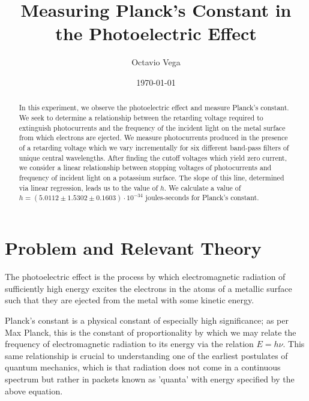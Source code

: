\documentclass[aps,twocolumn,secnumarabic,balancelastpage,amsmath,amssymb,nofootinbib, floatfix]{revtex4-2}
\begin{document}
\title{Measuring Planck's Constant in the Photoelectric Effect}
\author{Octavio Vega}
\date{\today}

\begin{abstract}
In this experiment, we observe the photoelectric effect and measure Planck's constant. We seek to determine a relationship between the retarding voltage required to extinguish photocurrents and the frequency of the incident light on the metal surface from which electrons are ejected. We measure photocurrents produced in the presence of a retarding voltage which we vary incrementally for six different band-pass filters of unique central wavelengths. After finding the cutoff voltages which yield zero current, we consider a linear relationship between stopping voltages of photocurrents and frequency of incident light on a potassium surface. The slope of this line, determined via linear regression, leads us to the value of $h$. We calculate a value of $h=\left(5.0112\pm 1.5302\pm 0.1603\right) \cdot 10^{-34}$ joules-seconds for Planck's constant. 
\end{abstract}

\maketitle


\section{Problem and Relevant Theory}

The photoelectric effect is the process by which electromagnetic radiation of sufficiently high energy excites the electrons in the atoms of a metallic surface such that they are ejected from the metal with some kinetic energy. 

Planck's constant is a physical constant of especially high significance; as per Max Planck, this is the constant of proportionality by which we may relate the frequency of electromagnetic radiation to its energy via the relation $E=h\nu$. This same relationship is crucial to understanding one of the earliest postulates of quantum mechanics, which is that radiation does not come in a continuous spectrum but rather in packets known as 'quanta' with energy specified by the above equation. 
\end{document}
